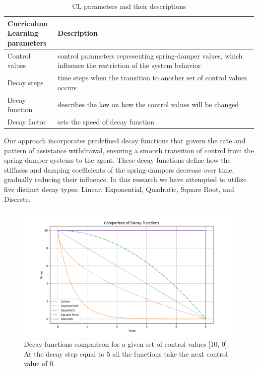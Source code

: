 \begin{table}[h]
	\caption{CL parameters and their descriptions}
	\centering
	\begin{tabular}{l|p{}}
		\toprule
		\makecell{\textbf{Curriculum}\\ \textbf{Learning}\\ \textbf{parameters}} & \textbf{Description} \\ \midrule
		Control values & control parameters representing spring-damper values, which influence the restriction of the system behavior\\ \hline 
		Decay steps & time steps when the transition to another set of control values occurs\\ \hline 
		Decay function & describes the law on how the control values will be changed\\ \hline
		Decay factor & sets the speed of decay function\\ 
		\bottomrule
	\end{tabular}
	\label{table: CL parameters}
\end{table}

Our approach incorporates predefined decay functions that govern the rate and pattern of assistance withdrawal, ensuring a smooth transition of control from the spring-damper systems to the agent. These decay functions define how the stiffness and damping coefficients of the spring-dampers decrease over time, gradually reducing their influence. In this research we have attempted to utilize five distinct decay types: Linear, Exponential, Quadratic, Square Root, and Discrete.

\begin{figure}[ht]
	\centering
	\includegraphics[width=13cm]{Figures/CL_decay_types_comparison.png}
	\caption{Decay functions comparison for a given set of control values [10, 0]. At the decay step equal to 5 all the functions take the next control value of 0.}
	\label{fig: decay functions}
\end{figure}

